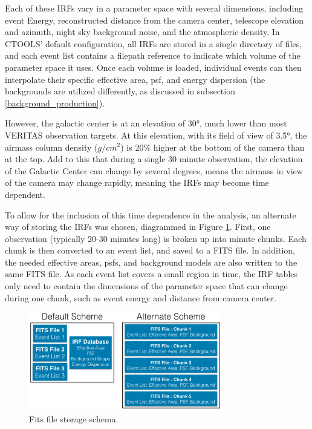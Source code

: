   Each of these IRFs vary in a parameter space with several dimensions, including event Energy, reconstructed distance from the camera center, telescope elevation and azimuth, night sky background noise, and the atmospheric density.
  In CTOOLS' default configuration, all IRFs are stored in a single directory of files, and each event list contains a filepath reference to indicate which volume of the parameter space it uses.
  Once each volume is loaded, individual events can then interpolate their specific effective area, psf, and energy dispersion (the backgrounds are utilized differently, as discussed in subsection \ref{background_production}).

  However, the galactic center is at an elevation of \ang{30}, much lower than most VERITAS observation targets.
  At this elevation, with its field of view of \ang{3.5}, the airmass column density ($g/cm^{2}$) is 20\% higher at the bottom of the camera than at the top.
  Add to this that during a single 30 minute observation, the elevation of the Galactic Center can change by several degrees, means the airmass in view of the camera may change rapidly, meaning the IRFs may become time dependent.

  To allow for the inclusion of this time dependence in the analysis, an alternate way of storing the IRFs was chosen, diagrammed in Figure \ref{fig:fits_scheme}.
  First, one observation (typically 20-30 minutes long) is broken up into  minute chunks.
  Each chunk is then converted to an event list, and saved to a FITS file.
  In addition, the needed effective areas, psfs, and background models are also written to the same FITS file.
  As each event list covers a small region in time, the IRF tables only need to contain the dimensions of the parameter space that can change during one chunk, such as event energy and distance from camera center.

  \begin{figure}[ht]
    \centering
    \includegraphics[width=0.75\textwidth]{images/FITS_diagrams_alternate_scheme.eps}
    \caption[FITS File Event Storage Schemes]
    {Fits file storage schema.}
    \label{fig:fits_scheme}
  \end{figure}


